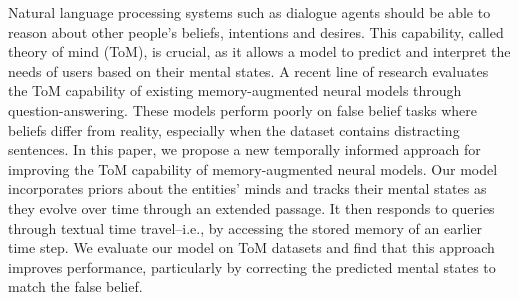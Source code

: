 Natural language processing systems such as dialogue agents should be able to reason about other people's beliefs, intentions and desires. This capability, called theory of mind (ToM), is crucial, as it allows a model to predict and interpret the needs of users based on their mental states. A recent line of research evaluates the ToM capability of existing memory-augmented neural models through question-answering. These models perform poorly on false belief tasks where beliefs differ from reality, especially when the dataset contains distracting sentences. In this paper, we propose a new temporally informed approach for improving the ToM capability of memory-augmented neural models. Our model incorporates priors about the entities' minds and tracks their mental states as they evolve over time through an extended passage. It then responds to queries through textual time travel--i.e., by accessing the stored memory of an earlier time step. We evaluate our model on ToM datasets and find that this approach improves performance, particularly by correcting the predicted mental states to match the false belief.
